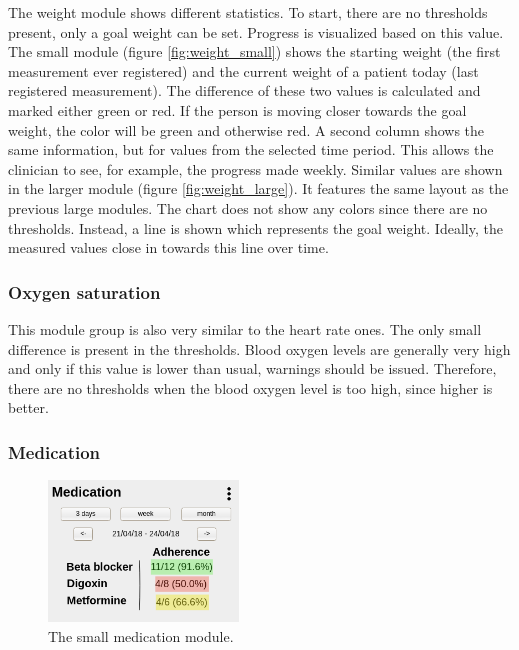         \noindent The weight module shows different statistics. To start, there are no thresholds present, only a goal weight can be set. Progress is visualized based on this value. The small module (figure \ref{fig:weight_small}) shows the starting weight (the first measurement ever registered) and the current weight of a patient today (last registered measurement). The difference of these two values is calculated and marked either green or red. If the person is moving closer towards the goal weight, the color will be green and otherwise red. A second column shows the same information, but for values from the selected time period. This allows the clinician to see, for example, the progress made weekly. Similar values are shown in the larger module (figure \ref{fig:weight_large}). It features the same layout as the previous large modules. The chart does not show any colors since there are no thresholds. Instead, a line is shown which represents the goal weight. Ideally, the measured values close in towards this line over time.

        \subsubsection{Oxygen saturation}

        This module group is also very similar to the heart rate ones. The only small difference is present in the thresholds. Blood oxygen levels are generally very high and only if this value is lower than usual, warnings should be issued. Therefore, there are no thresholds when the blood oxygen level is too high, since higher is better.

        \subsubsection{Medication}

        \begin{figure}[!htb]
            \centering
            \includegraphics[width=0.45\textwidth]{chapters/3_design/mockups/med_small}
            \caption{The small medication module.}\label{fig:med_small}
        \end{figure}

